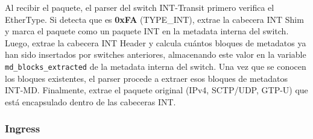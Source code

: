 Al recibir el paquete, el parser del switch INT-Transit primero verifica el EtherType. Si detecta que es \textbf{0xFA} (TYPE\_INT), extrae la cabecera INT Shim y marca el paquete como un paquete INT en la metadata interna del switch.
Luego, extrae la cabecera INT Header y calcula cuántos bloques de metadatos ya han sido insertados por switches anteriores, almacenando este valor en la variable \texttt{md\_blocks\_extracted} de la metadata interna del switch.
Una vez que se conocen los bloques existentes, el parser procede a extraer esos bloques de metadatos INT-MD. Finalmente, extrae el paquete original (IPv4, SCTP/UDP, GTP-U) que está encapsulado dentro de las cabeceras INT.

\subsubsection{Ingress}


